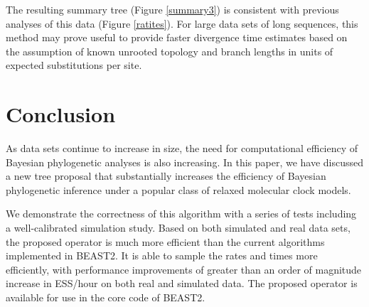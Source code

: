 \documentclass{bmcart}
\begin{document}
The resulting summary tree (Figure \ref{summary3}) is consistent with previous analyses of this data \cite{cooper2001complete} (Figure \ref{ratites}). For large data sets of long sequences, this method may prove useful to provide faster divergence time estimates based on the assumption of known unrooted topology and branch lengths in units of expected substitutions per site.



\section*{Conclusion}
As data sets continue to increase in size, the need for computational efficiency of Bayesian phylogenetic analyses is also increasing. In this paper, we have discussed a new tree proposal that substantially increases the efficiency of Bayesian phylogenetic inference under a popular class of relaxed molecular clock models.

We demonstrate the correctness of this algorithm with a series of tests including a well-calibrated simulation study. Based on both simulated and real data sets, the proposed operator is much more efficient than the current algorithms implemented in BEAST2. It is able to sample the rates and times more efficiently, with performance improvements of greater than an order of magnitude increase in ESS/hour on both real and simulated data. The proposed operator is available for use in the core code of BEAST2. 
\end{document}
